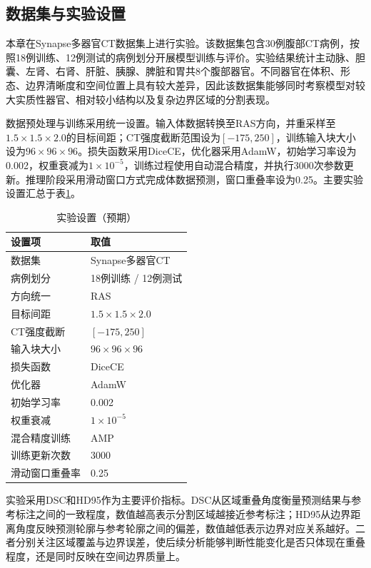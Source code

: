 \subsection{数据集与实验设置}

本章在Synapse多器官CT数据集上进行实验。该数据集包含30例腹部CT病例，按照18例训练、12例测试的病例划分开展模型训练与评价。实验结果统计主动脉、胆囊、左肾、右肾、肝脏、胰腺、脾脏和胃共8个腹部器官。不同器官在体积、形态、边界清晰度和空间位置上具有较大差异，因此该数据集能够同时考察模型对较大实质性器官、相对较小结构以及复杂边界区域的分割表现。

数据预处理与训练采用统一设置。输入体数据转换至RAS方向，并重采样至$1.5\times1.5\times2.0$的目标间距；CT强度截断范围设为$[-175,250]$，训练输入块大小设为$96\times96\times96$。损失函数采用DiceCE，优化器采用AdamW，初始学习率设为0.002，权重衰减为$1\times10^{-5}$，训练过程使用自动混合精度，并执行3000次参数更新。推理阶段采用滑动窗口方式完成体数据预测，窗口重叠率设为0.25。主要实验设置汇总于表\ref{tab:ch4-exp-setting}。

\begin{table}[htbp]
  \centering
  \caption{实验设置（预期）}
  \label{tab:ch4-exp-setting}
  \begin{tabular}{ll}
    \toprule
    设置项 & 取值 \\
    \midrule
    数据集 & Synapse多器官CT \\
    病例划分 & 18例训练 / 12例测试 \\
    方向统一 & RAS \\
    目标间距 & $1.5\times1.5\times2.0$ \\
    CT强度截断 & $[-175,250]$ \\
    输入块大小 & $96\times96\times96$ \\
    损失函数 & DiceCE \\
    优化器 & AdamW \\
    初始学习率 & 0.002 \\
    权重衰减 & $1\times10^{-5}$ \\
    混合精度训练 & AMP \\
    训练更新次数 & 3000 \\
    滑动窗口重叠率 & 0.25 \\
    \bottomrule
  \end{tabular}
\end{table}

实验采用DSC和HD95作为主要评价指标。DSC从区域重叠角度衡量预测结果与参考标注之间的一致程度，数值越高表示分割区域越接近参考标注；HD95从边界距离角度反映预测轮廓与参考轮廓之间的偏差，数值越低表示边界对应关系越好。二者分别关注区域覆盖与边界误差，使后续分析能够判断性能变化是否只体现在重叠程度，还是同时反映在空间边界质量上。

